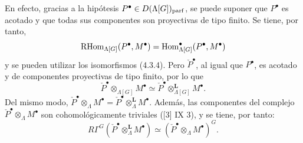 En efecto, gracias a la hipótesis $P^\bullet\in D(\Lambda[G])_{\mathrm{parf}}$, se puede suponer que $P^\bullet$ es acotado y que todas sus componentes son proyectivas de tipo finito. Se tiene, por tanto,
\[
\mathrm{RHom}_{\Lambda[G]}(P^\bullet,M^\bullet)=\operatorname{Hom}_{\Lambda[G]}^\bullet(P^\bullet,M^\bullet)
\]
y se pueden utilizar los isomorfismos (4.3.4). Pero $\check P^\bullet$, al igual que $P^\bullet$, es acotado y de componentes proyectivas de tipo finito, por lo que
\[
\check P^\bullet\otimes_{\Lambda[G]}M^\bullet\simeq \check P^\bullet\otimes_{\Lambda[G]}^{\mathbf L}M^\bullet.
\]
Del mismo modo, $\check P^\bullet\otimes_\Lambda M^\bullet=\check P^\bullet\otimes_\Lambda^{\mathbf L}M^\bullet$. Además, las componentes del complejo $\check P^\bullet\otimes_\Lambda M^\bullet$ son cohomológicamente triviales ([3] IX 3), y se tiene, por tanto:
\[
R\Gamma^G(\check P^\bullet\otimes_\Lambda^{\mathbf L}M^\bullet)\simeq (\check P^\bullet\otimes_\Lambda M^\bullet)^G.
\]
